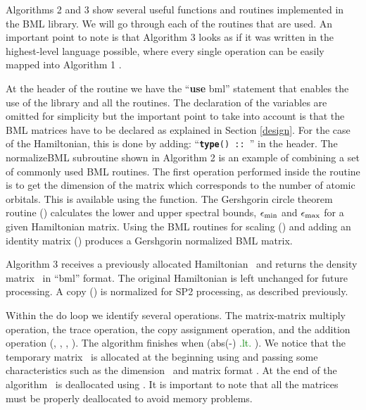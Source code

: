 Algorithms 2 and 3 show several useful functions and routines implemented in the BML library. We will go through each of the routines that are used. 
An important point to note is that Algorithm 3 looks as if it was written in the highest-level language possible, where every single operation can be easily mapped into Algorithm 1 \cite{Wilson2014}.

At the header of the routine we have the ``\textbf{use} bml'' statement that enables the use of the library and all the routines. The declaration of the variables are omitted for simplicity but the important point to take into account is that the BML matrices have to be declared as explained in Section \ref{design}. 
%
For the case of the Hamiltonian, this is done by adding: 
``\texttt{\textbf{type}() :: \hbml}'' 
in the header. 
%
The normalizeBML subroutine shown in Algorithm 2 is an example of combining a set of commonly used BML routines.
The first operation performed inside the routine is to get the dimension of the matrix which corresponds to the number of atomic orbitals. This is available using the  function. 
The Gershgorin circle theorem \cite{GGolub96} routine () calculates the lower and upper spectral bounds, $\epsilon_{\mathrm{min}}$ and $\epsilon_{\mathrm{max}}$ for a given Hamiltonian matrix. 
Using the BML routines for scaling () and adding an identity matrix ()
produces a Gershgorin normalized BML matrix.

Algorithm 3 receives a previously allocated Hamiltonian \hbml\, and returns the density matrix \pbml\, in ``bml'' format.
The original Hamiltonian is left unchanged for future processing. A copy () is normalized for SP2 processing, as described previously.

%

Within the do loop we identify several operations.
The matrix-matrix multiply operation, the trace operation, the copy assignment operation, and the addition operation (, , , ). 
%
The algorithm finishes when (abs(\noc-\trxb) \textcolor{green}{.lt.} \tol).
We notice that the temporary matrix \xx\, is allocated at the beginning using  and passing some characteristics such as the dimension \norb\, and matrix format \type.  At the end of the algorithm \xx\, is deallocated using . It is important to note that all the matrices must be properly deallocated to avoid memory problems. 


